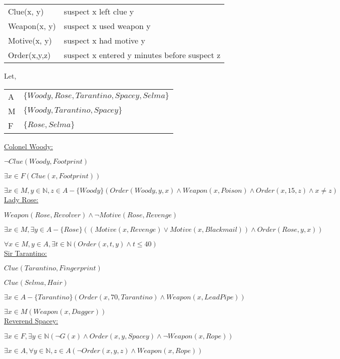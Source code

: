 \documentclass[addpoints]{exam}
\begin{document}
\begin{questions}
\begin{parts}
  \begin{tabular}{l@{ : }l}
    Clue(x, y) & suspect x left clue y \\
    Weapon(x, y) & suspect x used weapon y \\
    Motive(x, y) & suspect x had motive y \\
    Order(x,y,z) & suspect x entered y minutes before suspect z
  \end{tabular}
  \begin{solution}
   Let,\\
  \begin{tabular}{l@{ : }l}
    A & $\{Woody, Rose, Tarantino, Spacey,Selma\}$ \\
    M & $\{Woody, Tarantino, Spacey\}$ \\
    F & $\{Rose, Selma\}$ \\
  \end{tabular}

\underline{Colonel Woody:}

$\neg Clue(Woody,Footprint) $

$\exists x \in F (Clue(x,Footprint))$

$\exists x\in M,y\in \mathbb{N},z\in A - \{Woody\} (  Order(Woody, y, x )\wedge Weapon (x,Poison) \wedge Order(x,15,z) \wedge x \neq z)$ \\


\underline{Lady Rose:}

$Weapon(Rose,Revolver) \wedge \neg Motive (Rose, Revenge)$

$\exists x \in M, \exists y \in A - \{Rose\} ((Motive(x,Revenge) \vee Motive(x,Blackmail)) \wedge Order(Rose,y,x))$ 

$\forall x \in M, y \in A, \exists t \in \mathbb{N} (Order(x,t,y) \wedge t \leq 40)$\\

\underline{Sir Tarantino:}

$Clue(Tarantino,Fingerprint)$

$Clue(Selma,Hair)$

$\exists x \in A - \{Tarantino\} ( Order(x,70,Tarantino) \wedge Weapon(x,Lead Pipe))$

$\exists x \in M (Weapon(x,Dagger))$\\

\underline{Reverend Spacey:}

$\exists x \in F, \exists y \in \mathbb{N} (  \neg G(x) \wedge Order(x,y,Spacey) \wedge \neg Weapon(x,Rope))$

$\exists x \in A, \forall y \in \mathbb{N}, z \in A (\neg Order(x,y,z) \wedge Weapon(x,Rope)) $


\end{solution}
\end{parts}
\end{questions}
\end{document}
